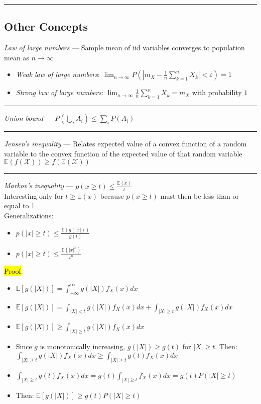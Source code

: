 {\color{black}\hrule height 0.001mm}

\subsection*{Other Concepts}
\emph{Law of large numbers} ---
Sample mean of iid variables converges to population mean as $n \rightarrow \infty$
\begin{itemize}
    \item \emph{Weak law of large numbers}: $\lim_{n \to \infty} P\left( \left| m_X - \frac{1}{n} \sum_{k=1}^n X_k \right| < \varepsilon \right) = 1$
    \item \emph{Strong law of large numbers}: $\lim_{n \to \infty} \frac{1}{n} \sum_{k=1}^n X_k = m_X$ with probability $1$
\end{itemize}

{\color{lightgray}\hrule height 0.001mm}

\emph{Union bound} --- $P(\bigcup_i A_i) \leq \sum_i P(A_i)$

{\color{lightgray}\hrule height 0.001mm}

\emph{Jensen's inequality} --- Relates expected value of a convex function of a random variable to the convex function of the expected value of that random variable\\
$\mathbb{E}(f(\mathcal{X})) \geq f(\mathbb{E}(\mathcal{X}))$

{\color{lightgray}\hrule height 0.001mm}

\emph{Markov's inequality} --- $p(x \geq t) \leq \frac{\mathbb{E}(x)}{t}$\\
Interesting only for $t \geq \mathbb{E}(x)$ because $p(x \geq t)$ must then be less than or equal to 1\\
Generalizations:
\begin{itemize}
    \item $p(|x| \geq t) \leq \frac{\mathbb{E}(g(|x|))}{g(t)}$
    \item $p(|x| \geq t) \leq \frac{\mathbb{E}(|x|^n)}{t^n}$
\end{itemize}
\hl{Proof}:
\begin{itemize}
    \item $ \mathbb{E}[g(|X|)] = \int_{-\infty}^\infty g(|X|) f_X(x) dx $
    \item $ \mathbb{E}[g(|X|)] = \int_{|X| < t} g(|X|) f_X(x) dx + \int_{|X| \geq t} g(|X|) f_X(x) dx $
    \item $ \mathbb{E}[g(|X|)] \geq \int_{|X| \geq t} g(|X|) f_X(x) dx $
    \item Since $g$ is monotonically increasing, $g(|X|) \geq g(t)$ for $|X| \geq t$. Then:
    $ \int_{|X| \geq t} g(|X|) f_X(x) dx \geq \int_{|X| \geq t} g(t) f_X(x) dx$
    \item $ \int_{|X| \geq t} g(t) f_X(x) dx = g(t) \int_{|X| \geq t} f_X(x) dx = g(t) P(|X| \geq t)$
    \item Then: $\mathbb{E}[g(|X|)] \geq g(t) P(|X| \geq t)$ 
\end{itemize}


